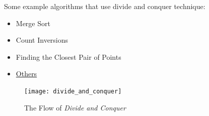 \documentclass[12pt]{article}
\begin{document}
Some example algorithms that use divide and conquer technique: 
\begin{itemize}
	\item Merge Sort
	\item Count Inversions
	\item Finding the Closest Pair of Points 
	\item \href{https://www.geeksforgeeks.org/divide-and-conquer/}{Others}
\end{itemize}	

\begin{figure}[h]
	\centering
	\texttt{[image: divide\_and\_conquer]}
	\caption{The Flow of \textit{Divide and Conquer}}
	\label{fig:divide_and_conquer}
\end{figure}
\end{document}
